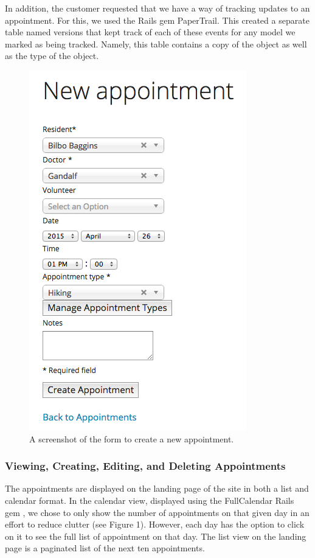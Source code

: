 \documentclass{sig-alternate}
\begin{document}
In addition, the customer requested that we have a way of tracking updates to an appointment.  For this, we used the Rails gem PaperTrail. \cite{papertrail}  This created a separate table named versions that kept track of each of these events for any model we marked as being tracked.  Namely, this table contains a copy of the object as well as the type of the object.

\begin{figure}
\includegraphics[scale=0.4]{NewAppointment}
\caption{A screenshot of the form to create a new appointment.}
\end{figure}

\subsubsection{Viewing, Creating, Editing, and Deleting Appointments}
The appointments are displayed on the landing page of the site in both a list and calendar format.  In the calendar view, displayed using the FullCalendar Rails gem \cite{fullcalendar}, we chose to only show the number of appointments on that given day in an effort to reduce clutter (see Figure 1).  However, each day has the option to click on it to see the full list of appointment on that day.  The list view on the landing page is a paginated list of the next ten appointments.
\end{document}
